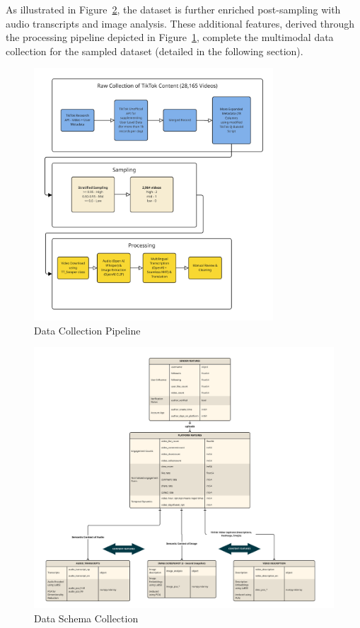 \documentclass[12pt,a4paper]{report}
\begin{document}
As illustrated in Figure~\ref{fig:data_schema}, the dataset is further enriched post-sampling with audio transcripts and image analysis. These additional features, derived through the processing pipeline depicted in Figure~\ref{fig:data_pipeline}, complete the multimodal data collection for the sampled dataset (detailed in the following section).
\begin{figure}[H]
    \centering
    \includegraphics[width=0.8\textwidth, page=1]{figures/data_collection.pdf}
    \caption{Data Collection Pipeline}
    \label{fig:data_pipeline}
\end{figure}
\begin{figure}[H]
    \centering
    \includegraphics[width=1.0\textwidth, page=1]{figures/data_collection_schema.pdf}
    \caption{Data Schema Collection}
    \label{fig:data_schema}
\end{figure}
\newpage
\end{document}
